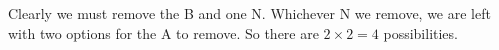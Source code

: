 Clearly we must remove the B and one N. Whichever N we remove, we are left with two options for the A to remove. So there are $2\times2=\boxed{4}$ possibilities.